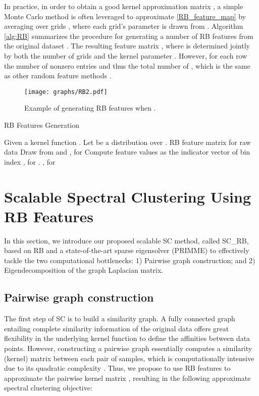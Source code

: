 \documentclass[sigconf]{acmart}
\newcommand{\1}{\boldsymbol{1}}
\newcommand{\0}{\boldsymbol{0}}
\begin{document}
In practice, in order to obtain a good kernel approximation matrix , a simple Monte Carlo method is often leveraged to approximate \eqref{RB_feature_map} by averaging over  grids , where each grid's parameter  is drawn from . Algorithm \ref{alg:RB} summarizes the procedure for generating a number  of RB features from the original dataset . The resulting feature matrix , where  is determined jointly by both the number of grids  and the kernel parameter . However, for each row the number of nonzero entries  and thus the total number of , which is the same as other random feature methods \cite{wu2016revisiting}.


\begin{figure}
    \centering
    \texttt{[image: graphs/RB2.pdf]}
\caption{Example of generating  RB features when .}
    \label{fig:RB_gen}
\end{figure}

\begin{algorithm}[t]
    \caption{ RB Features Generation}
    \label{alg:RB}
    \begin{algorithmic}[1]
      Given a kernel function . Let  be a distribution over .
     RB feature matrix  for raw data 
    \FOR {}
        \STATE Draw  from  and , for  
        \STATE Compute feature values  as the indicator vector of bin index , for .
    \ENDFOR
    \STATE , for 
    \end{algorithmic}
\end{algorithm}


\section{Scalable Spectral Clustering Using RB Features} \label{sec: scalable sc_rb}
In this section, we introduce our proposed scalable SC method, called SC\_RB, based on RB and a state-of-the-art sparse eigensolver (PRIMME) to effectively tackle the two computational bottlenecks: 1) Pairwise graph construction; and 2) Eigendecomposition of the graph Laplacian matrix.

\subsection{Pairwise graph construction}
The first step of SC is to build a similarity graph. A fully connected graph entailing complete similarity information of the original data offers great flexibility in the underlying kernel function to define the affinities between data points. However, constructing a pairwise graph essentially computes a similarity (kernel) matrix between each pair of samples, which is computationally intensive due to its quadratic complexity . Thus, we propose to use RB features  to approximate the pairwise kernel matrix , resulting in the following approximate spectral clustering objective:
\end{document}
